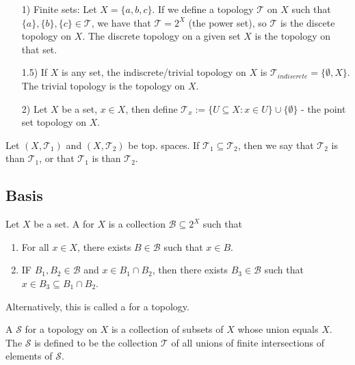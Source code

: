 \documentclass[12pt, a4paper, oneside, openright, titlepage]{book}
\begin{document}
\begin{eg}
    \leavevmode
    \begin{enumerate}
        \item[1)] Finite sets: Let $X = \{a,b,c\}$. If we define a topology $\mathcal{T}$ on $X$ such that $\{a\},\{b\},\{c\} \in \mathcal{T}$, we have that $\mathcal{T} = 2^X$ (the power set), so $\mathcal{T}$ is the discete topology on $X$. The discrete topology on a given set $X$ is the  topology on that set.
        \item[1.5)] If $X$ is any set, the indiscrete/trivial topology on $X$ is $\mathcal{T}_{indiscrete} = \{\emptyset,X\}$. The trivial topology is the  topology on $X$.
        \item[2)] Let $X$ be a set, $x \in X$, then define $\mathcal{T}_x := \{U \subseteq X: x \in U\}\cup\{\emptyset\}$ - the point set topology on $X$.
    \end{enumerate}
\end{eg}

\begin{defn}
    Let $(X,\mathcal{T}_1)$ and $(X,\mathcal{T}_2)$ be top. spaces. If $\mathcal{T}_1\subseteq \mathcal{T}_2$, then we say that $\mathcal{T}_2$ is  than $\mathcal{T}_1$, or that $\mathcal{T}_1$ is  than $\mathcal{T}_2$.
\end{defn}




\subsection{Basis}

\begin{defn}
    Let $X$ be a set. A  for $X$ is a collection $\mathcal{B}\subseteq 2^X$ such that \begin{enumerate}
        \item For all $x \in X$, there exists $B \in \mathcal{B}$ such that $x \in B$.
        \item IF $B_1,B_2 \in \mathcal{B}$ and $x \in B_1\cap B_2$, then there exists $B_3 \in \mathcal{B}$ such that $x \in B_3 \subseteq B_1\cap B_2$.
    \end{enumerate}
    Alternatively, this is called a  for a topology.
\end{defn}

\begin{defn}
    A  $\mathcal{S}$ for a topology on $X$ is a collection of subsets of $X$ whose union equals $X$. The  $\mathcal{S}$ is defined to be the collection $\mathcal{T}$ of all unions of finite intersections of elements of $\mathcal{S}$.
\end{defn}
\end{document}
